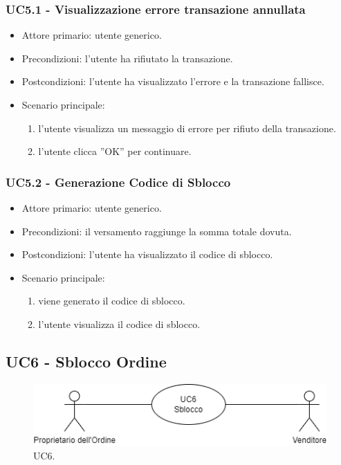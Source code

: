 \subsubsection{UC5.1 - Visualizzazione errore transazione annullata}

\begin{itemize}
    \item Attore primario: utente generico.
    \item Precondizioni: l'utente ha rifiutato la transazione.
    \item Postcondizioni: l'utente ha visualizzato l'errore e la transazione fallisce.
    \item Scenario principale: \begin{enumerate}
        \item l'utente visualizza un messaggio di errore per rifiuto della transazione.
        \item l’utente clicca ”OK” per continuare.
    \end{enumerate}
\end{itemize}

\subsubsection{UC5.2 - Generazione Codice di Sblocco}

\begin{itemize}
    \item Attore primario: utente generico.
    \item Precondizioni: il versamento raggiunge la somma totale dovuta.
    \item Postcondizioni: l'utente ha visualizzato il codice di sblocco.
    \item Scenario principale: \begin{enumerate}
        \item viene generato il codice di sblocco.
        \item l'utente visualizza il codice di sblocco.
    \end{enumerate}
\end{itemize}

\subsection{UC6 - Sblocco Ordine}

\begin{figure}[H]
    \centering
    \includegraphics[scale=0.7]{immagini/UseCases-UC6.png}
    \caption{UC6.}
  \end{figure}

